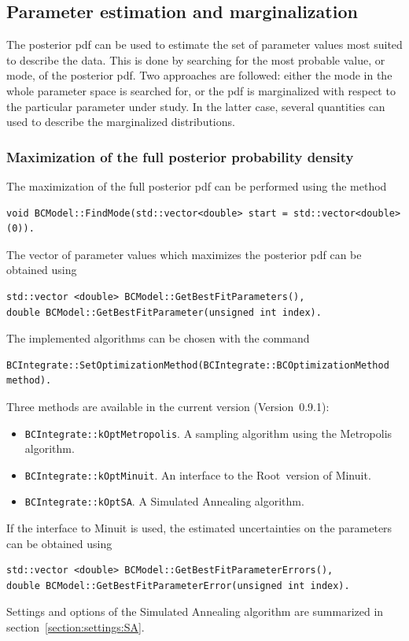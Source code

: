 \documentclass[11pt, a4paper]{article}
\newcommand{\Root}{{\sc Root}}
\newcommand{\versionno}{0.9.1}
\newcommand{\Version}{Version~\versionno}
\begin{document}

\subsection{Parameter estimation and marginalization}

The posterior pdf can be used to estimate the set of parameter values
most suited to describe the data. This is done by searching for the
most probable value, or mode, of the posterior pdf. Two approaches are
followed: either the mode in the whole parameter space is searched
for, or the pdf is marginalized with respect to the particular
parameter under study. In the latter case, several quantities can used
to describe the marginalized distributions.


\subsubsection{Maximization of the full posterior probability density}

The maximization of the full posterior pdf can be performed using the
method
%
\begin{verbatim}
void BCModel::FindMode(std::vector<double> start = std::vector<double>(0)).
\end{verbatim}

The vector of parameter values which maximizes the posterior pdf can be obtained using
%
\begin{verbatim}
std::vector <double> BCModel::GetBestFitParameters(),
double BCModel::GetBestFitParameter(unsigned int index).
\end{verbatim}
%
The implemented algorithms can be chosen with the command
%
\begin{verbatim}
BCIntegrate::SetOptimizationMethod(BCIntegrate::BCOptimizationMethod method).
\end{verbatim}
%
Three methods are available in the current version (\Version):
%
\begin{itemize}
\item \verb|BCIntegrate::kOptMetropolis|. A sampling algorithm using the
  Metropolis algorithm.
\item \verb|BCIntegrate::kOptMinuit|. An interface to the \Root\ version
  of Minuit.
\item \verb|BCIntegrate::kOptSA|. A Simulated Annealing algorithm.
\end{itemize}
%
If the interface to Minuit is used, the estimated uncertainties on the
parameters can be obtained using
%
\begin{verbatim}
std::vector <double> BCModel::GetBestFitParameterErrors(),
double BCModel::GetBestFitParameterError(unsigned int index).
\end{verbatim}
%
Settings and options of the Simulated Annealing algorithm are
summarized in section~\ref{section:settings:SA}.
\end{document}
